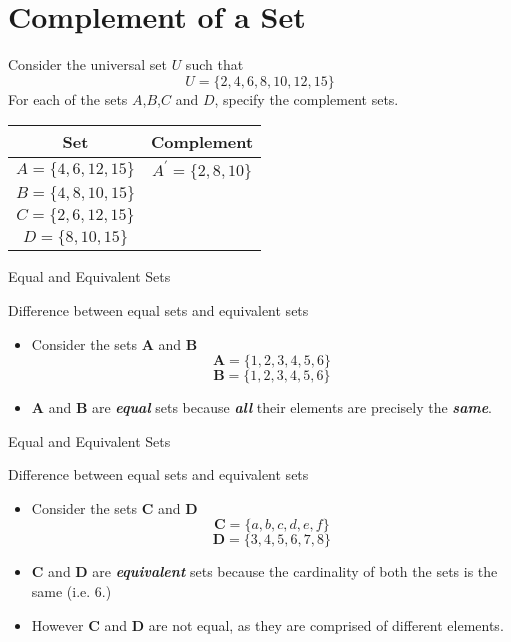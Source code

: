 
\section*{Complement of a Set}
Consider the universal set $U$ such that
\[U=\{2,4,6,8,10,12,15\} \]
For each of the sets $A$,$B$,$C$ and $D$, specify the complement sets.
{
	\LARGE
\begin{center}
\begin{tabular}{|c|c|}
  \hline
Set &\phantom{sp} Complement \phantom{sp}\\
\hline \phantom{sp} $A=\{4,6,12,15\}$ \phantom{sp} &
$A^{\prime}=\{2,8,10\}$ \\ \hline $B=\{4,8,10,15\}$ & \\ \hline
$C=\{2,6,12,15\}$ & \\ \hline $D=\{8,10,15\}$ & \\ \hline

\end{tabular}
\end{center}
}



{Equal and Equivalent Sets}

Difference between equal sets and equivalent sets

\begin{itemize}
\item Consider the sets \textbf{A} and \textbf{B}
\[ \boldsymbol{A} = \{ 1,2,3,4,5,6 \} \] 
\[ \boldsymbol{B} = \{1,2,3,4,5,6 \} \]
\item \textbf{A} and \textbf{B} are \textit{\textbf{equal}} sets because \textit{\textbf{all}} their
elements are precisely the \textit{\textbf{same}}.
\end{itemize}





{Equal and Equivalent Sets}

Difference between equal sets and equivalent sets

\begin{itemize}
\item Consider the sets \textbf{C} and \textbf{D}
\[ \boldsymbol{C} = \{a,b,c,d,e,f\} \]  \[ \boldsymbol{D} = \{3,4,5,6,7,8\} \]
\item \textbf{C} and \textbf{D} are \textit{\textbf{equivalent}} sets
because the cardinality of both the sets is the same (i.e. 6.)
\item However \textbf{C} and \textbf{D} are not equal, as they are comprised of different elements.
\end{itemize}







